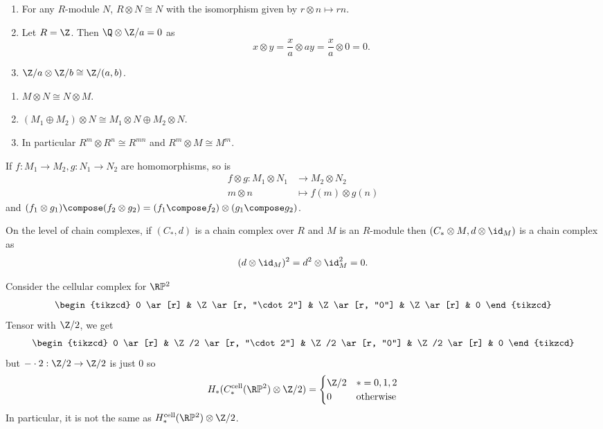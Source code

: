 \documentclass[a4paper]{article}
\renewcommand*{\P}{\mathbb{P}}
\newcommand{\cell}{\mathrm{cell}}
\begin{document}
\begin{eg}\leavevmode
  \begin{enumerate}
  \item For any \(R\)-module \(N\), \(R \otimes N \cong N\) with the isomorphism given by \(r \otimes n \mapsto rn\).
  \item Let \(R = \Z\). Then \(\Q \otimes \Z/a = 0\) as
    \[
      x \otimes y = \frac{x}{a} \otimes ay = \frac{x}{a} \otimes 0 = 0.
    \]
  \item \(\Z/a \otimes \Z/b \cong \Z/(a, b)\).
  \end{enumerate}
\end{eg}

\begin{proposition}\leavevmode
  \begin{enumerate}
  \item \(M \otimes N \cong N \otimes M\).
  \item \((M_1 \oplus M_2) \otimes N \cong M_1 \otimes N \oplus M_2 \otimes N\).
  \item In particular \(R^m \otimes R^n \cong R^{mn}\) and \(R^m \otimes M \cong M^m\).
  \end{enumerate}
\end{proposition}

If \(f: M_1 \to M_2, g: N_1 \to N_2\) are homomorphisms, so is
\begin{align*}
  f \otimes g: M_1 \otimes N_1 &\to M_2 \otimes N_2 \\
  m \otimes n &\mapsto f(m) \otimes g(n)
\end{align*}
and \((f_1 \otimes g_1) \compose (f_2 \otimes g_2) = (f_1 \compose f_2) \otimes (g_1 \compose g_2)\).

On the level of chain complexes, if \((C_*, d)\) is a chain complex over \(R\) and \(M\) is an \(R\)-module then \((C_* \otimes M, d \otimes \id_M)\) is a chain complex as
\[
  (d \otimes \id_M)^2 = d^2 \otimes \id_M^2 = 0.
\]

\begin{eg}
  Consider the cellular complex for \(\R\P^2\)
  \[
    \begin{tikzcd}
      0 \ar[r] & \Z \ar[r, "\cdot 2"] & \Z \ar[r, "0"] & \Z \ar[r] & 0
    \end{tikzcd}
  \]
  Tensor with \(\Z/2\), we get
  \[
    \begin{tikzcd}
      0 \ar[r] & \Z/2 \ar[r, "\cdot 2"] & \Z/2 \ar[r, "0"] & \Z/2 \ar[r] & 0
    \end{tikzcd}
  \] 
  but \(- \cdot 2: \Z/2 \to \Z/2\) is just \(0\) so
  \[
    H_*(C_*^\cell(\R\P^2) \otimes \Z/2) =
    \begin{cases}
      \Z/2 & * = 0, 1, 2 \\
      0 & \text{otherwise}
    \end{cases}
  \]
  In particular, it is not the same as \(H_*^\cell(\R\P^2) \otimes \Z/2\).
\end{eg}
 
\end{document}
